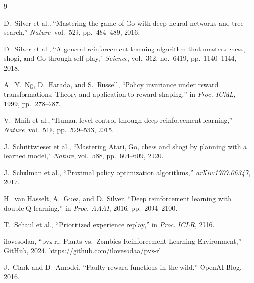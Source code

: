 \begin{thebibliography}{9}

D.~Silver et al., ``Mastering the game of Go with deep neural networks and tree search,'' \emph{Nature}, vol.~529, pp.~484--489, 2016.

D.~Silver et al., ``A general reinforcement learning algorithm that masters chess, shogi, and Go through self-play,'' \emph{Science}, vol.~362, no.~6419, pp.~1140--1144, 2018.

A.~Y.~Ng, D.~Harada, and S.~Russell, ``Policy invariance under reward transformations: Theory and application to reward shaping,'' in \emph{Proc. ICML}, 1999, pp.~278--287.

V.~Mnih et al., ``Human-level control through deep reinforcement learning,'' \emph{Nature}, vol.~518, pp.~529--533, 2015.

J.~Schrittwieser et al., ``Mastering Atari, Go, chess and shogi by planning with a learned model,'' \emph{Nature}, vol.~588, pp.~604--609, 2020.

J.~Schulman et al., ``Proximal policy optimization algorithms,'' \emph{arXiv:1707.06347}, 2017.

H.~van Hasselt, A.~Guez, and D.~Silver, ``Deep reinforcement learning with double Q-learning,'' in \emph{Proc. AAAI}, 2016, pp.~2094--2100.

T.~Schaul et al., ``Prioritized experience replay,'' in \emph{Proc. ICLR}, 2016.

ilovesodaa, ``pvz-rl: Plants vs.\ Zombies Reinforcement Learning Environment,'' GitHub, 2024. \url{https://github.com/ilovesodaa/pvz-rl}

J.~Clark and D.~Amodei, ``Faulty reward functions in the wild,'' OpenAI Blog, 2016.

\end{thebibliography}


